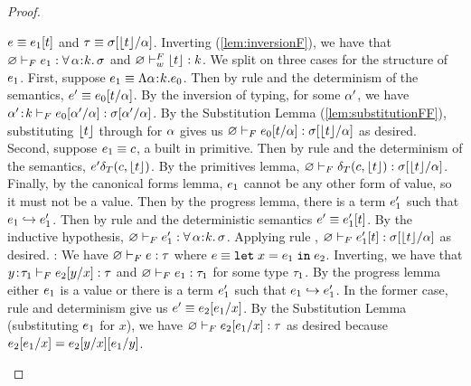 \begin{proof}
\begin{itemize}
  $\sexpr \equiv \tyapp{\sexpr_1}{\stype}$ and
  $\sftype \equiv \subst{\sigma}{\tvar}{\forgetreft{\stype}}$. 
  Inverting (\ref{lem:inversionF}), we have that 
  $\hasftype{\varnothing}{\sexpr_1}{\polytype{\tvar}{\skind}{\sigma}}$
  and $\isWFFT{\varnothing}{\forgetreft{\stype}}{\skind}$.
  We split on three cases for the structure of $\sexpr_1$.
  First, suppose $\sexpr_1 \equiv \tabs{\tvar}{\skind}{\sexpr_0}$.
  Then by rule \eTAppAbs and the determinism of the semantics, 
  $\sexpr' \equiv \subst{\sexpr_0}{\tvar}{\stype}$.
  By the inversion of typing, for some $\tvar'$, we have
  $\hasftype{\bind{\tvar'}{\skind}}{\subst{\sexpr_0}{\tvar}{\tvar'}}
  {\subst{\sigma}{\tvar}{\tvar'}}$.
  By the Substitution Lemma (\ref{lem:substitutionFF}), 
  substituting $\forgetreft{\stype}$ 
  through for $\tvar$  gives us 
  $\hasftype{\varnothing}{\subst{\sexpr_0}{\tvar}{\stype}}{\subst{\sigma}{\tvar}{\forgetreft{\stype}}}$ as desired.
  Second, suppose $\sexpr_1 \equiv \sconst$, a built in primitive.
  Then by rule \eTPrim and the determinism of the semantics, 
  $\sexpr' \delta_T(\sconst,\forgetreft{\stype})$. By the primitives lemma,
  $\hasftype{\varnothing}{\delta_T(\sconst,\forgetreft{\stype})}{\subst{\sigma}{\tvar}{\forgetreft{\stype}}}$.
  Finally, by the canonical forms lemma, $\sexpr_1$ cannot be any other
  form of value, so it must not be a value. Then by the progress lemma,
  there is a term $\sexpr'_1$ such that $\sexpr_1 \step \sexpr'_1$. 
  Then by rule \eTApp and the deterministic semantics
  $\sexpr' \equiv \tyapp{\sexpr'_1}{\stype}$.  By the inductive hypothesis,
  $\hasftype{\varnothing}{\sexpr'_1}{\polytype{\tvar}{\skind}{\sigma}}$.
  Applying rule \fTApp, 
  $\hasftype{\varnothing}{\tyapp{\sexpr'_1}{\stype}}{\subst{\sigma}{\tvar}{\forgetreft{\stype}}}$
  as desired.
  \pfcase{\fLet}: We have 
  $\hasftype{\varnothing}{\sexpr}{\sftype}$ where
  $\sexpr \equiv \eletin{x}{\sexpr_1}{\sexpr_2}$. Inverting,
  we have that 
  $\hasftype{\bind{y}{\sftype_1}}{\subst{\sexpr_2}{x}{y}}{\sftype}$
  and $\hasftype{\varnothing}{\sexpr_1}{\sftype_1}$
  for some type $\sftype_1$. 
  By the progress lemma either $\sexpr_1$ is a value
  or there is a term $\sexpr'_1$ such that $\sexpr_1 \step \sexpr'_1$.
  In the former case, rule \eLetV and determinism give us
  $\sexpr' \equiv \subst{\sexpr_2}{x}{\sexpr_1}$.
  By the Substitution Lemma (substituting $\sexpr_1$ for $x$), 
  we have $\hasftype{\varnothing}{\subst{\sexpr_2}{x}{\sexpr_1}}{\sftype}$
  as desired because 
  $\subst{\sexpr_2}{x}{\sexpr_1} = \subst{\subst{\sexpr_2}{x}{y}}{y}{\sexpr_1}$.

\end{itemize}
\end{proof}
